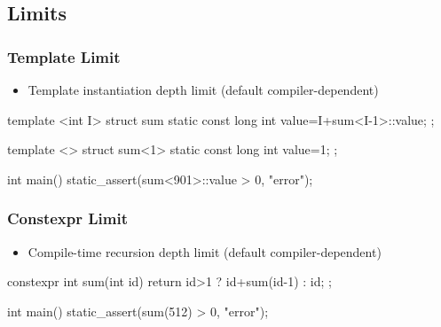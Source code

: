 \documentclass[aspectratio=43]{beamer}
\begin{document}
\subsection{Limits}

\begin{frame}[fragile]\frametitle{Template Limit}
  \begin{itemize}
    \item Template instantiation depth limit (default compiler-dependent)
  \end{itemize}

\begin{Cpplisting}{}
template <int I>
struct sum{
    static const long int value=I+sum<I-1>::value;
};

template <>
struct sum<1>{
    static const long int value=1;
};

int main(){
    static_assert(sum<901>::value > 0, "error");
}
\end{Cpplisting}
\end{frame}


\begin{frame}[fragile]\frametitle{Constexpr Limit}
  \begin{itemize}
    \item Compile-time recursion depth limit (default compiler-dependent)
  \end{itemize}

\begin{Cpplisting}{}






constexpr int sum(int id){
    return id>1 ? id+sum(id-1) : id;
};

int main(){
    static_assert(sum(512) > 0, "error");
}
\end{Cpplisting}
\end{frame}

\begin{comment}
\begin{frame}[fragile]\frametitle{Example}
\begin{Cpplisting}[: template recursion]{}
constexpr int sum(int id){
    return id>1 ? id+sum(id-1) : id;
};
\end{Cpplisting}
Which of the following would work (and why)?

\begin{Cpplisting}[: template recursion]{}
int main( int argc, char** argv){
  static_assert(sum(16) > 0, "error");
  int arg=atoi(argv[1]);
  if(sum(arg) < 0) std::cout<<"Error!\n";
  static_assert(sum(arg) > 0, "error");
}
\end{Cpplisting}
How would you write this as a template metafunction?
\end{frame}
\end{comment}
\end{document}
